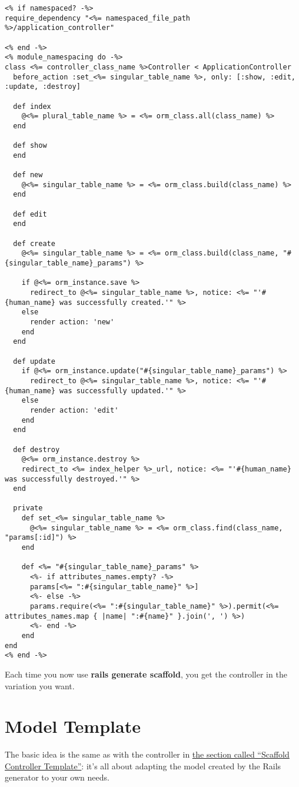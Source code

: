 \documentclass[a4paper]{book}
\newcounter{tab}[chapter]
\newcommand{\chap}[1]{\newpage\thispagestyle{empty}\chapter{#1}\label{chap:\thechapter}}
\begin{document}
\begin{shaded}\begin{verbatim}
<% if namespaced? -%>
require_dependency "<%= namespaced_file_path %>/application_controller"

<% end -%>
<% module_namespacing do -%>
class <%= controller_class_name %>Controller < ApplicationController
  before_action :set_<%= singular_table_name %>, only: [:show, :edit, :update, :destroy]

  def index
    @<%= plural_table_name %> = <%= orm_class.all(class_name) %>
  end

  def show
  end

  def new
    @<%= singular_table_name %> = <%= orm_class.build(class_name) %>
  end

  def edit
  end

  def create
    @<%= singular_table_name %> = <%= orm_class.build(class_name, "#{singular_table_name}_params") %>

    if @<%= orm_instance.save %>
      redirect_to @<%= singular_table_name %>, notice: <%= "'#{human_name} was successfully created.'" %>
    else
      render action: 'new'
    end
  end

  def update
    if @<%= orm_instance.update("#{singular_table_name}_params") %>
      redirect_to @<%= singular_table_name %>, notice: <%= "'#{human_name} was successfully updated.'" %>
    else
      render action: 'edit'
    end
  end

  def destroy
    @<%= orm_instance.destroy %>
    redirect_to <%= index_helper %>_url, notice: <%= "'#{human_name} was successfully destroyed.'" %>
  end

  private
    def set_<%= singular_table_name %>
      @<%= singular_table_name %> = <%= orm_class.find(class_name, "params[:id]") %>
    end

    def <%= "#{singular_table_name}_params" %>
      <%- if attributes_names.empty? -%>
      params[<%= ":#{singular_table_name}" %>]
      <%- else -%>
      params.require(<%= ":#{singular_table_name}" %>).permit(<%= attributes_names.map { |name| ":#{name}" }.join(', ') %>)
      <%- end -%>
    end
end
<% end -%>
\end{verbatim}\end{shaded}

Each time you now use \textbf{rails generate scaffold}, you get the controller in the variation you want.

\chap{Model Template}\label{model-template}

The basic idea is the same as with the controller in \hyperref[scaffoldux5fcontrollerux5ftemplate]{the section called “Scaffold Controller Template”}: it's all about adapting the model created by the Rails generator to your own needs.
\end{document}
